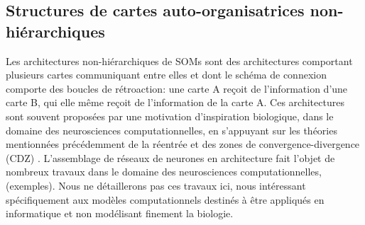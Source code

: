 \documentclass[../main]{subfiles}
\begin{document}


\subsection{Structures de cartes auto-organisatrices non-hiérarchiques}

Les architectures non-hiérarchiques de SOMs sont des architectures comportant plusieurs cartes communiquant entre elles et dont le schéma de connexion comporte des boucles de rétroaction: une carte A reçoit de l'information d'une carte B, qui elle même reçoit de l'information de la carte A.
Ces architectures sont souvent proposées par une motivation d'inspiration biologique, dans le domaine des neurosciences computationnelles, en s'appuyant sur les théories mentionnées précédemment de la réentrée \cite{Edelman1982GroupSA} et des zones de convergence-divergence (CDZ) \cite{damasio_time-locked_1989}.
L'assemblage de réseaux de neurones en architecture fait l'objet de nombreux travaux dans le domaine des neurosciences computationnelles, (exemples). Nous ne détaillerons pas ces travaux ici, nous intéressant spécifiquement aux modèles computationnels destinés à être appliqués en informatique et non modélisant finement la biologie.
\end{document}
